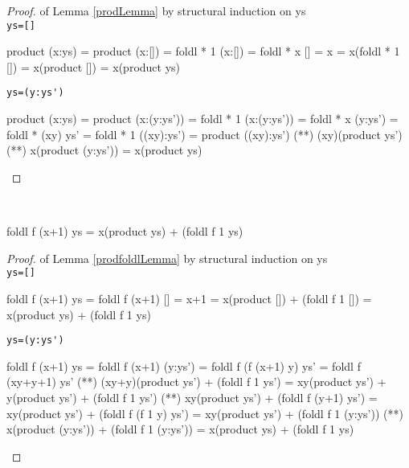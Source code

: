 \begin{proof} of Lemma \ref{prodLemma} by structural induction on ys\\
\verb|ys=[]|
\begin{code}
product (x:ys) = product (x:[])
               = foldl * 1 (x:[])
               = foldl * x []
               = x
               = x(foldl * 1 [])
               = x(product [])
               = x(product ys)
\end{code}
\verb|ys=(y:ys')|
\begin{code}
product (x:ys) = product (x:(y:ys'))
               = foldl * 1 (x:(y:ys'))
               = foldl * x (y:ys')
               = foldl * (xy) ys'
               = foldl * 1 ((xy):ys')
               = product ((xy):ys')
               (**) (xy)(product ys')
               (**) x(product (y:ys'))
               = x(product ys)
\end{code}
\end{proof}
\begin{lemma}\label{prodfoldlLemma}\ 
\begin{code}
foldl f (x+1) ys = x(product ys) + (foldl f 1 ys)
\end{code}
\end{lemma}
\begin{proof} of Lemma \ref{prodfoldlLemma} by structural induction on ys\\
\verb|ys=[]|
\begin{code}
foldl f (x+1) ys
           = foldl f (x+1) []
           = x+1
           = x(product []) + (foldl f 1 [])
           = x(product ys) + (foldl f 1 ys)
\end{code}
\verb|ys=(y:ys')|
\begin{code}
foldl f (x+1) ys
           = foldl f (x+1) (y:ys')
           = foldl f (f (x+1) y) ys'
           = foldl f (xy+y+1) ys'
           (**) (xy+y)(product ys') + (foldl f 1 ys')
           = xy(product ys') + y(product ys') + (foldl f 1 ys')
           (*\sEq{IH}*) xy(product ys') + (foldl f (y+1) ys')
           = xy(product ys') + (foldl f (f 1 y) ys')
           = xy(product ys') + (foldl f 1 (y:ys'))
           (*\sEq{\ref{prodLemma}}*) x(product (y:ys')) + (foldl f 1 (y:ys'))
           = x(product ys) + (foldl f 1 ys)
\end{code}
\end{proof}
